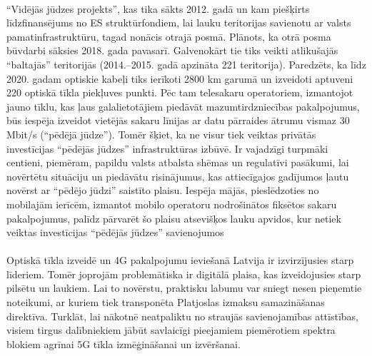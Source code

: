 \paragraph{}
“Vidējās jūdzes projekts”, kas tika sākts 2012. gadā un kam piešķirts līdzfinansējums
no ES struktūrfondiem, lai lauku teritorijas savienotu ar valsts pamatinfrastruktūru,
tagad nonācis otrajā posmā. Plānots, ka otrā posma būvdarbi sāksies 2018. gada
pavasarī. Galvenokārt tie tiks veikti atlikušajās “baltajās” teritorijās (2014.–2015. gadā
apzināta 221 teritorija). Paredzēts, ka līdz 2020. gadam optiskie kabeļi tiks ierīkoti
2800 km garumā un izveidoti aptuveni 220 optiskā tīkla piekļuves punkti. Pēc tam
telesakaru operatoriem, izmantojot jauno tīklu, kas ļaus galalietotājiem piedāvāt
mazumtirdzniecības pakalpojumus, būs iespēja izveidot vietējās sakaru līnijas ar datu
pārraides ātrumu vismaz 30 Mbit/s (“pēdējā jūdze”). Tomēr šķiet, ka ne visur tiek
veiktas privātās investīcijas “pēdējās jūdzes” infrastruktūras izbūvē. Ir vajadzīgi
turpmāki centieni, piemēram, papildu valsts atbalsta shēmas un regulatīvi pasākumi,
lai novērtētu situāciju un piedāvātu risinājumus, kas attiecīgajos gadījumos ļautu
novērst ar “pēdējo jūdzi” saistīto plaisu. Iespēja mājās, pieslēdzoties no mobilajām
ierīcēm, izmantot mobilo operatoru nodrošinātos fiksētos sakaru pakalpojumus,
palīdz pārvarēt šo plaisu atsevišķos lauku apvidos, kur netiek veiktas investīcijas
“pēdējās jūdzes” savienojumos\cite{platjosla}
\paragraph{}
Optiskā tīkla izveidē un 4G pakalpojumu ieviešanā Latvija ir izvirzījusies starp
līderiem. Tomēr joprojām problemātiska ir digitālā plaisa, kas izveidojusies starp
pilsētu un laukiem. Lai to novērstu, praktisku labumu var sniegt nesen pieņemtie
noteikumi, ar kuriem tiek transponēta Platjoslas izmaksu samazināšanas direktīva.
Turklāt, lai nākotnē neatpaliktu no straujās savienojamības attīstības, visiem tirgus
dalībniekiem jābūt savlaicīgi pieejamiem piemērotiem spektra blokiem agrīnai 5G
tīkla izmēģināšanai un izvēršanai.
